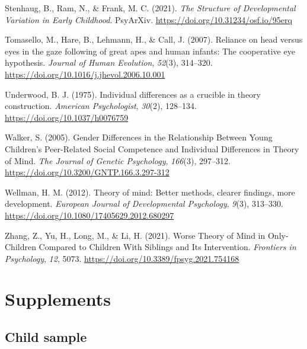 \documentclass[
  man,floatsintext]{apa6}
\newlength{\cslhangindent}
\newlength{\cslentryspacingunit} %
\newenvironment{CSLReferences}[2] %
 {%
  \setlength{\parindent}{0pt}
  \ifodd #1
  \let\oldpar\par
  \def\par{\hangindent=\cslhangindent\oldpar}
  \fi
  \setlength{\parskip}{#2\cslentryspacingunit}
 }%
 {}
\begin{document}
\begin{CSLReferences}{1}{0}
\leavevmode{}%
Stenhaug, B., Ram, N., \& Frank, M. C. (2021). \emph{The {Structure} of {Developmental Variation} in {Early Childhood}}. {PsyArXiv}. \url{https://doi.org/10.31234/osf.io/95erq}

\leavevmode{}%
Tomasello, M., Hare, B., Lehmann, H., \& Call, J. (2007). Reliance on head versus eyes in the gaze following of great apes and human infants: The cooperative eye hypothesis. \emph{Journal of Human Evolution}, \emph{52}(3), 314--320. \url{https://doi.org/10.1016/j.jhevol.2006.10.001}

\leavevmode{}%
Underwood, B. J. (1975). Individual differences as a crucible in theory construction. \emph{American Psychologist}, \emph{30}(2), 128--134. \url{https://doi.org/10.1037/h0076759}

\leavevmode{}%
Walker, S. (2005). Gender {Differences} in the {Relationship Between Young Children}'s {Peer-Related Social Competence} and {Individual Differences} in {Theory} of {Mind}. \emph{The Journal of Genetic Psychology}, \emph{166}(3), 297--312. \url{https://doi.org/10.3200/GNTP.166.3.297-312}

\leavevmode{}%
Wellman, H. M. (2012). Theory of mind: {Better} methods, clearer findings, more development. \emph{European Journal of Developmental Psychology}, \emph{9}(3), 313--330. \url{https://doi.org/10.1080/17405629.2012.680297}

\leavevmode{}%
Zhang, Z., Yu, H., Long, M., \& Li, H. (2021). Worse {Theory} of {Mind} in {Only-Children Compared} to {Children With Siblings} and {Its Intervention}. \emph{Frontiers in Psychology}, \emph{12}, 5073. \url{https://doi.org/10.3389/fpsyg.2021.754168}

\end{CSLReferences}

\endgroup

\newpage

\hypertarget{supplements}{%
\section{Supplements}\label{supplements}}

\hypertarget{child-sample}{%
\subsection{Child sample}\label{child-sample}}
\end{document}
